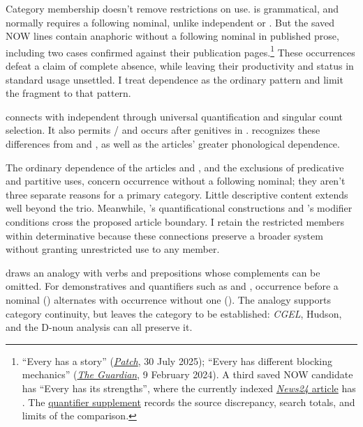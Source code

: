 \documentclass[12pt]{article}
\begin{document}
Category membership doesn't remove restrictions on use.  is grammatical, and  normally requires a following nominal, unlike independent  or . But the saved NOW lines contain anaphoric  without a following nominal in published prose, including two cases confirmed against their publication pages.\footnote{\enquote{Every has a story} (\href{https://patch.com/california/temecula/attention-detail-monument-refresh-underway-across-all-temecula-city-parks}{\textit{Patch}}, 30 July 2025); \enquote{Every has different blocking mechanics} (\href{https://www.theguardian.com/sport/2024/feb/09/super-bowl-chiefs-49ers-travis-kelce-tony-romo}{\textit{The Guardian}}, 9 February 2024). A third saved NOW candidate has \enquote{Every has its strengths}, where the currently indexed \href{https://www.news24.com/life/motoring/new-models/toyota-launches-new-corolla-in-sa-why-it-took-so-long-for-the-car-to-be-introduced-20200501-2}{\textit{News24} article} has . The \href{run:quantifier-controls.pdf}{quantifier supplement} records the source discrepancy, search totals, and limits of the comparison.} These occurrences defeat a claim of complete absence, while leaving their productivity and status in standard usage unsettled. I treat dependence as the ordinary pattern and limit the fragment to that pattern.

 connects with independent  through universal quantification and singular count selection. It also permits / and occurs after genitives in . \textcite[156--158]{spinillo2004reconceptualising} recognizes these differences from  and , as well as the articles' greater phonological dependence.

The ordinary dependence of the articles and , and the exclusions of predicative and partitive uses, concern occurrence without a following nominal; they aren't three separate reasons for a primary category. Little descriptive content extends well beyond the trio. Meanwhile, 's quantificational constructions and 's modifier conditions cross the proposed article boundary. I retain the restricted members within determinative because these connections preserve a broader system without granting unrestricted use to any member.

\textcite[140--144]{spinillo2004reconceptualising} draws an analogy with verbs and prepositions whose complements can be omitted. For demonstratives and quantifiers such as  and , occurrence before a nominal () alternates with occurrence without one (). The analogy supports category continuity, but leaves the category to be established: \textit{CGEL}, Hudson, and the D-noun analysis can all preserve it.
\end{document}

